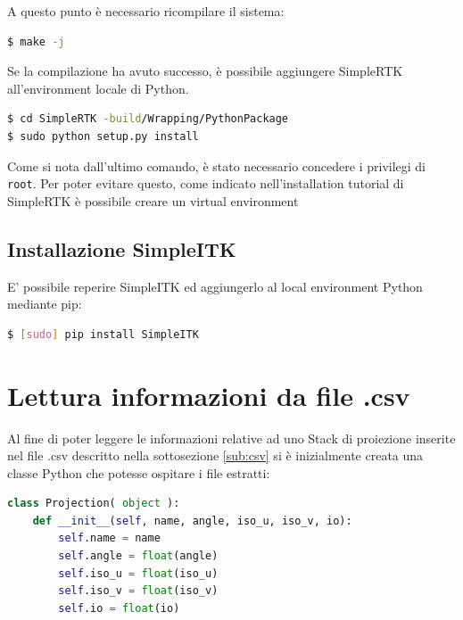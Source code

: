 \documentclass[a4paper,12pt, doubleside]{report}
\begin{document}
                    A questo punto è necessario ricompilare il sistema:
                    \begin{lstlisting}[language=bash, frame=bt]
$ make -j
                    \end{lstlisting}
                    
                    Se la compilazione ha avuto successo, è possibile aggiungere SimpleRTK all'environment locale di Python.
                    \begin{lstlisting}[language=bash, frame=bt]
$ cd SimpleRTK -build/Wrapping/PythonPackage
$ sudo python setup.py install
                    \end{lstlisting}
                    Come si nota dall'ultimo comando, è stato necessario concedere i privilegi di \texttt{root}. Per poter evitare questo, come indicato nell'installation tutorial di SimpleRTK è possibile creare un virtual environment\cite{simplertk-wiki}
               
                \subsection{Installazione SimpleITK}
                    E' possibile reperire SimpleITK ed aggiungerlo al local environment Python mediante pip:
                \begin{lstlisting}[language=bash, frame=bt]
$ [sudo] pip install SimpleITK
                    \end{lstlisting}
                        
        \section{Lettura informazioni da file .csv}
            \label{sec:lettura-csv}
            Al fine di poter leggere le informazioni relative ad uno Stack di proiezione inserite nel file .csv descritto nella sottosezione \ref{sub:csv} si è inizialmente creata una classe Python che potesse ospitare i file estratti:
            
            \begin{lstlisting}[language=python, frame=bt]
class Projection( object ):
    def __init__(self, name, angle, iso_u, iso_v, io):
        self.name = name
        self.angle = float(angle)
        self.iso_u = float(iso_u)
        self.iso_v = float(iso_v)
        self.io = float(io)
            \end{lstlisting}
            
\end{document}
